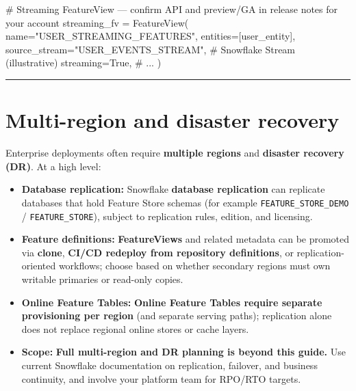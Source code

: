 \documentclass[
  letterpaper,
  DIV=11,
  numbers=noendperiod]{scrreprt}
\newenvironment{Shaded}{\begin{snugshade}}{\end{snugshade}}
\newcommand{\CommentTok}[1]{\textcolor[rgb]{0.37,0.37,0.37}{#1}}
\newcommand{\NormalTok}[1]{\textcolor[rgb]{0.00,0.23,0.31}{#1}}
\newcommand{\OperatorTok}[1]{\textcolor[rgb]{0.37,0.37,0.37}{#1}}
\newcommand{\StringTok}[1]{\textcolor[rgb]{0.13,0.47,0.30}{#1}}
\newcommand{\VariableTok}[1]{\textcolor[rgb]{0.07,0.07,0.07}{#1}}
\providecommand{\tightlist}{%
  \setlength{\itemsep}{0pt}\setlength{\parskip}{0pt}}\usepackage{longtable,booktabs,array}
\begin{document}
\begin{Shaded}
\begin{Highlighting}[]
\CommentTok{\# Streaming FeatureView — confirm API and preview/GA in release notes for your account}
\NormalTok{streaming\_fv }\OperatorTok{=}\NormalTok{ FeatureView(}
\NormalTok{    name}\OperatorTok{=}\StringTok{"USER\_STREAMING\_FEATURES"}\NormalTok{,}
\NormalTok{    entities}\OperatorTok{=}\NormalTok{[user\_entity],}
\NormalTok{    source\_stream}\OperatorTok{=}\StringTok{"USER\_EVENTS\_STREAM"}\NormalTok{,  }\CommentTok{\# Snowflake Stream (illustrative)}
\NormalTok{    streaming}\OperatorTok{=}\VariableTok{True}\NormalTok{,}
    \CommentTok{\# ...}
\NormalTok{)}
\end{Highlighting}
\end{Shaded}

\begin{center}\rule{0.5\linewidth}{0.5pt}\end{center}

\hypertarget{multi-region-and-disaster-recovery}{%
\section{Multi-region and disaster
recovery}\label{multi-region-and-disaster-recovery}}

Enterprise deployments often require \textbf{multiple regions} and
\textbf{disaster recovery (DR)}. At a high level:

\begin{itemize}
\tightlist
\item
  \textbf{Database replication:} Snowflake \textbf{database replication}
  can replicate databases that hold Feature Store schemas (for example
  \texttt{FEATURE\_STORE\_DEMO} / \texttt{FEATURE\_STORE}), subject to
  replication rules, edition, and licensing.
\item
  \textbf{Feature definitions:} \textbf{FeatureViews} and related
  metadata can be promoted via \textbf{clone}, \textbf{CI/CD redeploy
  from repository definitions}, or replication-oriented workflows;
  choose based on whether secondary regions must own writable primaries
  or read-only copies.
\item
  \textbf{Online Feature Tables:} \textbf{Online Feature Tables require
  separate provisioning per region} (and separate serving paths);
  replication alone does not replace regional online stores or cache
  layers.
\item
  \textbf{Scope:} \textbf{Full multi-region and DR planning is beyond
  this guide.} Use current Snowflake documentation on replication,
  failover, and business continuity, and involve your platform team for
  RPO/RTO targets.
\end{itemize}
\end{document}
